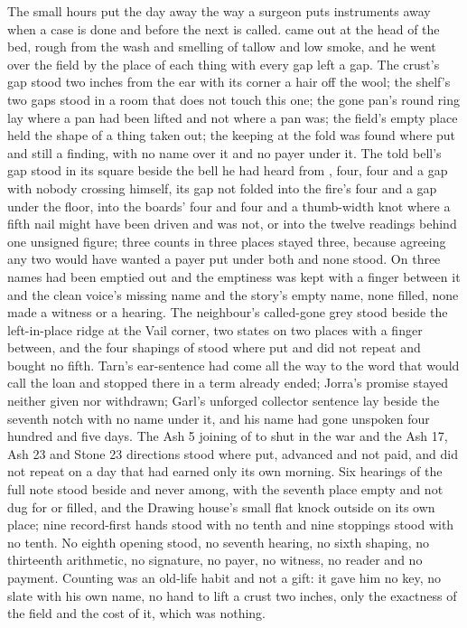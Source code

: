 The small hours put the day away the way a surgeon puts instruments away when a case is done and before the next is called.  came out at the head of the bed, rough from the wash and smelling of tallow and low smoke, and he went over the field by the place of each thing with every gap left a gap. The crust's gap stood two inches from the ear with its corner a hair off the wool; the shelf's two gaps stood in a room that does not touch this one; the gone pan's round ring lay where a pan had been lifted and not where a pan was; the field's empty place held the shape of a thing taken out; the keeping at the fold was found where put and still a finding, with no name over it and no payer under it. The told bell's gap stood in its square beside the bell he had heard from , four, four and a gap with nobody crossing himself, its gap not folded into the fire's four and a gap under the floor, into the boards' four and four and a thumb-width knot where a fifth nail might have been driven and was not, or into the twelve readings behind one unsigned figure; three counts in three places stayed three, because agreeing any two would have wanted a payer put under both and none stood. On  three names had been emptied out and the emptiness was kept with a finger between it and the clean voice's missing name and the story's empty name, none filled, none made a witness or a hearing. The neighbour's called-gone grey stood beside the left-in-place ridge at the Vail corner, two states on two places with a finger between, and the four shapings of  stood where put and did not repeat and bought no fifth. Tarn's ear-sentence had come all the way to the word that would call the loan and stopped there in a term already ended; Jorra's promise stayed neither given nor withdrawn; Garl's unforged collector sentence lay beside the seventh notch with no name under it, and his name had gone unspoken four hundred and five days. The Ash 5 joining of  to  shut in the war and the Ash 17, Ash 23 and Stone 23 directions stood where put, advanced and not paid, and did not repeat on a day that had earned only its own morning. Six hearings of the full note stood beside and never among, with the seventh place empty and not dug for or filled, and the Drawing house's small flat knock outside on its own place; nine record-first hands stood with no tenth and nine stoppings stood with no tenth. No eighth opening stood, no seventh hearing, no sixth shaping, no thirteenth arithmetic, no signature, no payer, no witness, no reader and no payment. Counting was an old-life habit and not a gift: it gave him no key, no slate with his own name, no hand to lift a crust two inches, only the exactness of the field and the cost of it, which was nothing.

